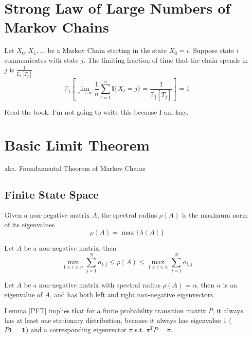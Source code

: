\section{Strong Law of Large Numbers of Markov Chains}
\begin{theorem}\label{SLLN}
    Let $X_0, X_1, \dots$ be a Markov Chain starting in the state $X_0=i$. Suppose state $i$ communicates with state $j$. The limiting fraction of time that the chain spends in $j$ is $\frac{1}{\mathbb{E_j}[T_j]}$.
    \[ \mathbb{P}_i[\lim_{n\to\infty}\frac{1}{n}\sum_{t=1}^n\mathbb{I}\{X_t=j\} = \frac{1}{\mathbb{E_j}[T_j]}] = 1 \]
\end{theorem}
\begin{sketchproof}
    Read the book. I'm not going to write this because I am lazy.
\end{sketchproof}


\section{Basic Limit Theorem}\label{BasicLimitTheorem}
aka. Foundamental Theorem of Markov Chains

    \subsection{Finite State Space}
    \begin{definition}
        Given a non-negative matrix $A$, the spectral radius $\rho(A)$ is the maximum norm of its eigenvalues
        \[ \rho(A) = \max\{ \lambda(A) \} \]
    \end{definition}
    \begin{proposition}
        Let $A$ be a non-negative matrix, then
        \[ \min_{1\le i \le n} \sum_{j=1}^N a_{i,j} \le \rho(A) \le \max_{1\le i \le n} \sum_{j=1}^N a_{i,j} \]
    \end{proposition}
    \begin{lemma}\label{PFT}
        Let $A$ be a non-negative matrix with spectral radius $\rho(A) = \alpha$, then $\alpha$ is an eigenvalue of $A$, and has both left and right non-negative eigenvectors.
    \end{lemma}
    \begin{remark}
        Lemma \ref{PFT} implies that for a finite probability transition matrix $P$, it always has at least one stationary distribution, because it always has eigenvalue $1$ ($P\mathbf{1} = \mathbf{1}$) and a corresponding eigenvector $\pi$ s.t. $\pi^TP = \pi$.
    \end{remark}


